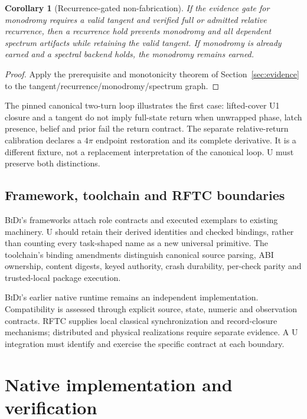 \documentclass[11pt]{article}
\newtheorem{corollary}[definition]{Corollary}
\theoremstyle{remark}
\newcommand{\bidi}{\textsc{BiDi}}
\begin{document}
\begin{corollary}[Recurrence-gated non-fabrication]
If the evidence gate for monodromy requires a valid tangent and verified
full or admitted relative recurrence, then a recurrence hold prevents
monodromy and all dependent spectrum artifacts while retaining the valid
tangent. If monodromy is already earned and a spectral backend holds, the
monodromy remains earned.
\end{corollary}
\begin{proof}
Apply the prerequisite and monotonicity theorem of
Section~\ref{sec:evidence} to the tangent/recurrence/monodromy/spectrum graph.
\end{proof}

The pinned canonical two-turn loop illustrates the first case: lifted-cover
U1 closure and a tangent do not imply full-state return when unwrapped
phase, latch presence, belief and prior fail the return contract. The
separate relative-return calibration declares a $4\pi$ endpoint restoration
and its complete derivative. It is a different fixture, not a replacement
interpretation of the canonical loop. U must preserve both distinctions.

\subsection{Framework, toolchain and RFTC boundaries}

\bidi{}'s frameworks attach role contracts and executed exemplars to
existing machinery. U should retain their derived identities and checked
bindings, rather than counting every task-shaped name as a new universal
primitive. The toolchain's binding amendments distinguish canonical source
parsing, ABI ownership, content digests, keyed authority, crash durability,
per-check parity and trusted-local package execution.

\bidi{}'s earlier native runtime remains an independent implementation.
Compatibility is assessed through explicit source, state, numeric and
observation contracts. RFTC supplies local classical synchronization and
record-closure mechanisms; distributed and physical realizations require
separate evidence. A U integration must identify and exercise the specific
contract at each boundary.

\section{Native implementation and verification}
\label{sec:artifact}
\end{document}
